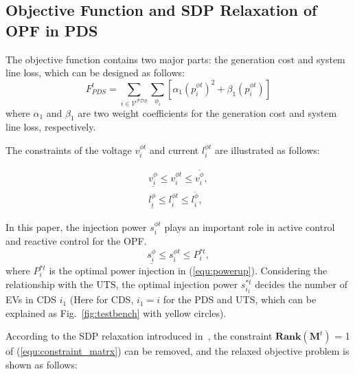 \documentclass[final]{IEEEtran}
\begin{document}
\subsection{Objective Function and SDP Relaxation of OPF in PDS}\label{sec:OPF}
The objective function contains two major parts: the generation cost and system line loss, which can be designed as follows:
\begin{equation}
F^t_{PDS} = \sum_{i\in\mathcal{V^{PDS}}}\sum_{\phi_i}[\alpha_{1} (p^{\phi t}_{i})^2 + \beta_{1}(p^{\phi t}_{i})] \label{equ:constraint_PDS_obj}
\end{equation}
where $\alpha_{1}$ and $\beta_{1}$ are two weight coefficients for the generation cost and system line loss, respectively.

The constraints of the voltage $v^{\phi t}_{i}$ and current $l^{\phi t}_{i}$ are illustrated as follows:

\begin{subequations}\label{equ:constraint_PDS_v_l}
	\begin{align} 
	\underline{v^{\phi }_{i}} \leq v^{\phi t}_{i} \leq \overline{v^{\phi }_{i}},  \label{equ:constraint_PDS_v} \\
	\underline{l^{\phi }_{i}} \leq l^{\phi t}_{i} \leq \overline{l^{\phi }_{i}}, \label{equ:constraint_PDS_l}
	\end{align}
\end{subequations}

In this paper, the injection power $s^{\phi t}_{i}$ plays an important role in active control and reactive control for the OPF.
\begin{equation}
\underline{s^{\phi }_{i}} \leq s^{\phi t}_{i} \leq P^{*t}_{i}, \label{equ:constain_PDS_s}
\end{equation}
where $P^{*t}_{i}$ is the optimal power injection in (\ref{equ:powerup}). Considering the relationship with the UTS, the optimal injection power $s^{*t}_{i_1}$ decides the number of EVs in CDS $i_1$ (Here for CDS, $i_1 = i$ for the PDS and UTS, which can be explained as Fig.~\ref{fig:testbench} with yellow circles). 

According to the SDP relaxation introduced in~\cite{gan2014con123vex,pe015dis456ed}, the constraint $\mathbf{Rank}({\mathbf{M}^t})$ = 1 of (\ref{equ:constraint_matrx}) can be removed, and the relaxed objective problem is shown as follows:
\end{document}

